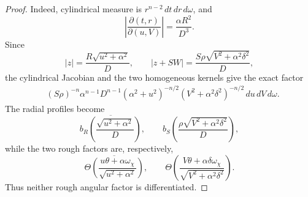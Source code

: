 \documentclass[11pt]{article}
\numberwithin{equation}{section}
\theoremstyle{remark}
\theoremstyle{definition}
\begin{document}
\begin{proof}
Indeed, cylindrical measure is \(r^{n-2}\,dt\,dr\,d\omega\), and
\[
 \left|\frac{\partial(t,r)}{\partial(u,V)}\right|
 =\frac{\alpha R^2}{D^3}.
\]
Since
\[
 |z|=\frac{R\sqrt{u^2+\alpha^2}}{D},\qquad
 |z+SW|=\frac{S\rho\sqrt{V^2+\alpha^2\delta^2}}{D},
\]
the cylindrical Jacobian and the two homogeneous kernels give the exact
factor
\begin{align}
 &(S\rho)^{-n}\alpha^{n-1}D^{n-1}
 (\alpha^2+u^2)^{-n/2}
 (V^2+\alpha^2\delta^2)^{-n/2}\,du\,dV\,d\omega.
 \label{eq:unequal-jacobian}
\end{align}
The radial profiles become
\begin{equation}\label{eq:unequal-profile-pullback}
 \overline{b_R\left(\frac{\sqrt{u^2+\alpha^2}}{D}\right)},
 \qquad
 b_S\left(\frac{\rho\sqrt{V^2+\alpha^2\delta^2}}{D}\right),
\end{equation}
while the two rough factors are, respectively,
\begin{equation}\label{eq:unequal-angular-separation}
 \overline{\Theta\left(\frac{u\theta+\alpha\omega_\chi}
                    {\sqrt{u^2+\alpha^2}}\right)},
 \qquad
 \Theta\left(\frac{V\theta+\alpha\delta\omega_\chi}
                   {\sqrt{V^2+\alpha^2\delta^2}}\right).
\end{equation}
Thus neither rough angular factor is differentiated.


\end{proof}
\end{document}
